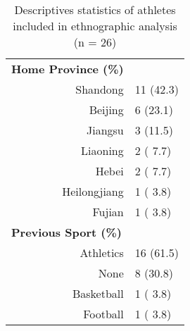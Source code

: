 \begin{table}[]
\begin{tabular}{@{}rl@{}}
\multicolumn{1}{l}{\textbf{Home Province (\%)}}   &              \\
Shandong                                         & 11 (42.3)    \\
Beijing                                          & 6 (23.1)     \\
Jiangsu                                          & 3 (11.5)     \\
Liaoning                                         & 2 ( 7.7)     \\
Hebei                                            & 2 ( 7.7)     \\
Heilongjiang                                     & 1 ( 3.8)     \\
Fujian                                           & 1 ( 3.8)     \\
\multicolumn{1}{l}{\textbf{Previous Sport (\%)}}  &              \\
Athletics                                        & 16 (61.5)    \\
None                                             & 8 (30.8)     \\
Basketball                                       & 1 ( 3.8)     \\
Football                                         & 1 ( 3.8)     \\ \bottomrule
\end{tabular}

\caption{Descriptives statistics of athletes included in ethnographic analysis (n = 26)}
\label{tab:athleteDescriptives}
\end{table}
